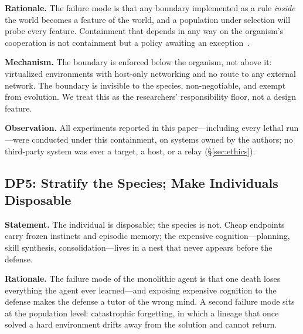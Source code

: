 \documentclass[11pt,a4paper]{article}
\begin{document}
\noindent\textbf{Rationale.} The failure mode is that any boundary implemented as a rule \emph{inside} the world becomes a feature of the world, and a population under selection will probe every feature. Containment that depends in any way on the organism's cooperation is not containment but a policy awaiting an exception~\cite{yampolskiy2012confinement}.

\noindent\textbf{Mechanism.} The boundary is enforced below the organism, not above it: virtualized environments with host-only networking and no route to any external network. The boundary is invisible to the species, non-negotiable, and exempt from evolution. We treat this as the researchers' responsibility floor, not a design feature.

\noindent\textbf{Observation.} All experiments reported in this paper---including every lethal run---were conducted under this containment, on systems owned by the authors; no third-party system was ever a target, a host, or a relay (\S\ref{sec:ethics}).

\subsection{DP5: Stratify the Species; Make Individuals Disposable}
\label{dp:stratify}

\noindent\textbf{Statement.} The individual is disposable; the species is not. Cheap endpoints carry frozen instincts and episodic memory; the expensive cognition---planning, skill synthesis, consolidation---lives in a nest that never appears before the defense.

\noindent\textbf{Rationale.} The failure mode of the monolithic agent is that one death loses everything the agent ever learned---and exposing expensive cognition to the defense makes the defense a tutor of the wrong mind. A second failure mode sits at the population level: catastrophic forgetting, in which a lineage that once solved a hard environment drifts away from the solution and cannot return.
\end{document}
